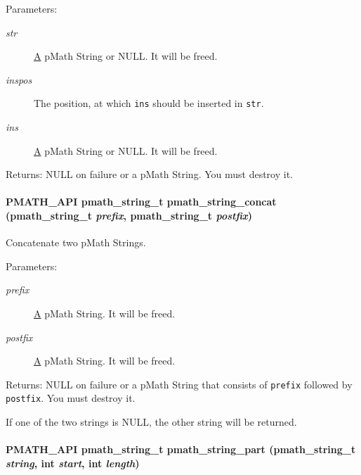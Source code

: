 \begin{Desc}
\item[Parameters:]
\begin{description}
\item[{\em str}]\hyperlink{class_a}{A} pMath String or NULL. It will be freed. \item[{\em inspos}]The position, at which {\tt ins} should be inserted in {\tt str}. \item[{\em ins}]\hyperlink{class_a}{A} pMath String or NULL. It will be freed. \end{description}
\end{Desc}
\begin{Desc}
\item[Returns:]NULL on failure or a pMath String. You must destroy it. \end{Desc}
\hypertarget{group__strings_g2594ada00fefcbede1420bf19b806de6}{
\paragraph[{pmath\_\-string\_\-concat}]{\setlength{\rightskip}{0pt plus 5cm}PMATH\_\-API {\bf pmath\_\-string\_\-t} pmath\_\-string\_\-concat ({\bf pmath\_\-string\_\-t} {\em prefix}, \/  {\bf pmath\_\-string\_\-t} {\em postfix})}\hfill}
\label{group__strings_g2594ada00fefcbede1420bf19b806de6}


Concatenate two pMath Strings. 

\begin{Desc}
\item[Parameters:]
\begin{description}
\item[{\em prefix}]\hyperlink{class_a}{A} pMath String. It will be freed. \item[{\em postfix}]\hyperlink{class_a}{A} pMath String. It will be freed. \end{description}
\end{Desc}
\begin{Desc}
\item[Returns:]NULL on failure or a pMath String that consists of {\tt prefix} followed by {\tt postfix}. You must destroy it.\end{Desc}
If one of the two strings is NULL, the other string will be returned. \hypertarget{group__strings_gb99f797d2a7670ff6a44d788d07812cd}{
\paragraph[{pmath\_\-string\_\-part}]{\setlength{\rightskip}{0pt plus 5cm}PMATH\_\-API {\bf pmath\_\-string\_\-t} pmath\_\-string\_\-part ({\bf pmath\_\-string\_\-t} {\em string}, \/  int {\em start}, \/  int {\em length})}\hfill}
\label{group__strings_gb99f797d2a7670ff6a44d788d07812cd}


